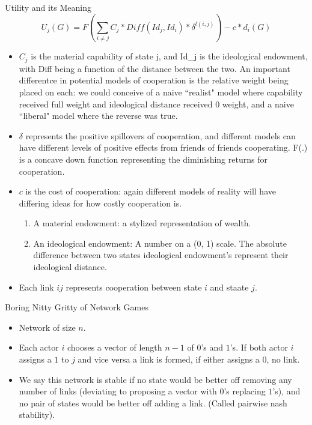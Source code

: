 \documentclass{beamer}
\begin{document}
\begin{frame}{Utility and its Meaning}
\begin{equation}
U_{j}(G) = F(\sum_{i \neq j} C_{j} * Diff(Id_{j}, Id_{i}) * \delta^{l(i, j)}) - c*d_{i}(G)
\end{equation}
\begin{itemize}
\item $C_{j}$ is the material capability of state j, and Id_{j} is the ideological endowment, with Diff being a function of the distance between the two. An important differentce in potential models of cooperation is the relative weight being placed on each: we could conceive of a naive ``realist" model where capability received full weight and ideological distance received 0 weight, and a naive ``liberal" model where the reverse was true.
\item $\delta$ represents the positive spillovers of cooperation, and different models can have different levels of positive effects from friends of friends cooperating. F(.) is a concave down function representing the diminishing returns for cooperation.
\item $c$ is the cost of cooperation: again different models of reality will have differing ideas for how costly cooperation is.
\begin{enumerate}
\item A material endowment: a stylized representation of wealth.
\item An ideological endowment: A number on a (0, 1) scale. The absolute difference between two states ideological endowment's represent their ideological distance.
\end{enumerate}
\item Each link $ij$ represents cooperation between state $i$ and staate $j$.
\end{itemize}
\end{frame}

\begin{frame}{Boring Nitty Gritty of Network Games}
\begin{itemize}
\item Network of size $n$.
\item Each actor $i$ chooses a vector of length $n-1$ of $0$'s and $1$'s. If both actor $i$ assigns a $1$ to $j$ and vice versa a link is formed, if either assigns a $0$, no link.
\item We say this network is stable if no state would be better off removing any number of links (deviating to proposing a vector with $0$'s replacing $1$'s), and no pair of states would be better off adding a link. (Called pairwise nash stability).
\end{itemize} 
\end{frame}
\end{document}
